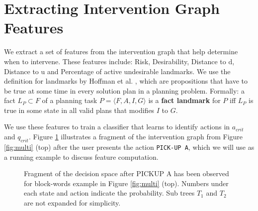 \documentclass[letterpaper]{article}
\theoremstyle{plain}
\begin{document}
\section{Extracting Intervention Graph Features}
\label{sec:features}
We extract a set of features from the intervention graph that help determine when to intervene. These features include: Risk, Desirability, Distance to $\mathrm{d}$, Distance to $\mathrm{u}$ and Percentage of active undesirable landmarks. We use the definition for landmarks by Hoffman et al. , which are propositions that have to be true at some time in every solution plan in a planning problem. Formally: a fact $L_P \subset F$ of a planning task $ P = \langle F, A, I, G \rangle$ is a \textbf{fact landmark} for $P$ iff $L_P$ is true in some state in all valid plans that modifies $I$ to $G$. 

We use these features to train a classifier that learns to identify actions in $a_{crit}$ and $q_{crit}$. Figure \ref{fig:feature} illustrates a fragment of the intervention graph from Figure \ref{fig:multi} (top) after the user presents the action \texttt{PICK-UP A}, which we will use as a running example to discuss feature computation.

\begin{figure}[tb]
        \caption{Fragment of the decision space after PICKUP A has been observed for block-words example in Figure \ref{fig:multi} (top). Numbers under each state and action indicate the probability. Sub trees $T_1$ and $T_2$ are not expanded for simplicity.}
        \label{fig:feature}
\end{figure} 
\end{document}
